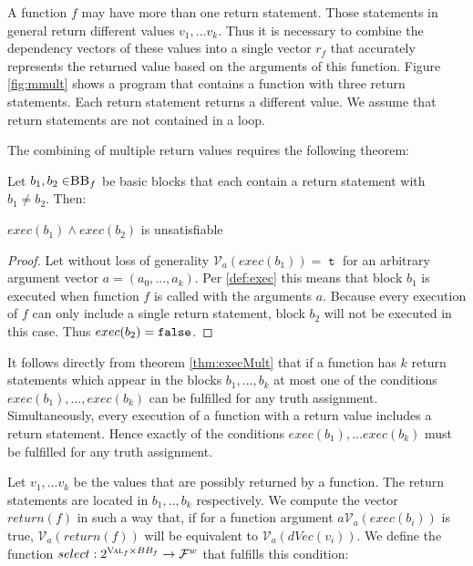 A function $f$ may have more than one return statement. Those statements in general return different values $v_1, ... v_k$. Thus it is necessary to combine the dependency vectors of these values into a single vector $r_f$ that accurately represents the returned value based on the arguments of this function. Figure \ref{fig:mmult} shows a program that contains a function with three return statements. Each return statement returns a different value. We assume that return statements are not contained in a loop.

The combining of multiple return values requires the following theorem:

\begin{theorem}\label{thm:execMult}
    Let $b_1, b_2 \in \mbb_f$ be basic blocks that each contain a return statement with $b_1 \neq b_2$. Then:
    \begin{center}
        $exec(b_1) \land exec(b_2)$ is unsatisfiable
    \end{center}
\end{theorem}

\begin{proof}
Let without loss of generality $\mathcal{V}_a (exec(b_1)) = \mttt$ for an arbitrary argument vector $a = (a_0, ..., a_k)$. Per \ref{def:exec} this means that block $b_1$ is executed when function $f$ is called with the arguments $a$. Because every execution of $f$ can only include a single return statement, block $b_2$ will not be executed in this case. Thus $exec(b_2) = \mathtt{false}$.
\end{proof}
It follows directly from theorem \ref{thm:execMult} that if a function has $k$ return statements which appear in the blocks $b_1, ..., b_k$ at most one of the conditions $exec(b_1),..., exec(b_k)$ can be fulfilled for any truth assignment. Simultaneously, every execution of a function with a return value includes a return statement. Hence exactly of the conditions $exec(b_1),... exec(b_k)$ must be fulfilled for any truth assignment.

Let $v_1, ... v_k$ be the values that are possibly returned by a function. The return statements are located in $b_1, .., b_k$ respectively. We compute the vector $return(f)$ in such a way that, if for a function argument $a \mathcal{V}_a(exec(b_i))$ is true, $\mathcal{V}_a(return(f))$ will be equivalent to $\mathcal{V}_a(dVec(v_i))$. We define the function $select: 2^{\textsc{Val}_f \times BB_f} \to \mathcal{F}^w$ that fulfills this condition:

